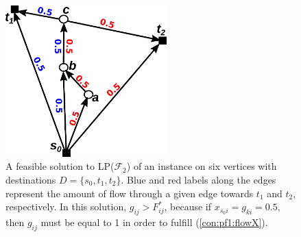 \begin{figure}[h!]
        \centering
        \includegraphics[height=2.3in]{counterex}
        \caption{A feasible solution to LP($\mathcal{F}_2$) of an instance on six vertices with destinations $D=\{s_0,t_1,t_2\}$.
		 Blue and red labels along the edges represent the amount of flow through a given edge towards $t_1$ and $t_2$, respectively.
		 In this solution, $g_{ij}>F^*_{ij}$, because if $x_{s_0i}=g_{ki}=0.
		5$, then $g_{ij}$ must be equal to 1 in order to fulfill (\ref{con:pf1:flowX}).}
        \label{fig:counterex}
\end{figure}
 
